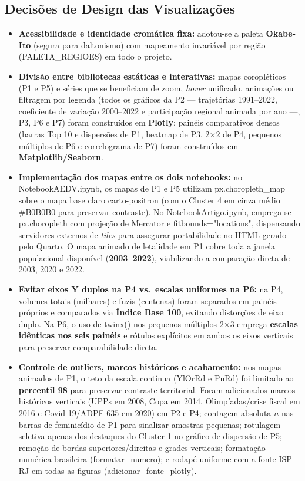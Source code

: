 \documentclass[11pt,a4paper]{article}
\newcommand{\code}[1]{{\ttfamily\footnotesize\allowbreak #1}}
\begin{document}
\subsection{Decisões de Design das Visualizações}
\begin{itemize}
  \setlength{\itemsep}{3pt}\setlength{\parskip}{0pt}
  \item \textbf{Acessibilidade e identidade cromática fixa:} adotou-se a paleta \textbf{Okabe-Ito} (segura para daltonismo) com mapeamento invariável por região (\code{PALETA\_REGIOES}) em todo o projeto.
  \item \textbf{Divisão entre bibliotecas estáticas e interativas:} mapas coropléticos (P1 e P5) e séries que se beneficiam de zoom, \textit{hover} unificado, animações ou filtragem por legenda (todos os gráficos da P2 --- trajetórias 1991--2022, coeficiente de variação 2000--2022 e participação regional animada por ano ---, P3, P6 e P7) foram construídos em \textbf{Plotly}; painéis comparativos densos (barras Top 10 e dispersões de P1, heatmap de P3, 2$\times$2 de P4, pequenos múltiplos de P6 e correlograma de P7) foram construídos em \textbf{Matplotlib/Seaborn}.
  \item \textbf{Implementação dos mapas entre os dois notebooks:} no \code{NotebookAEDV.ipynb}, os mapas de P1 e P5 utilizam \code{px.choropleth\_map} sobre o mapa base claro \code{carto-positron} (com o Cluster 4 em cinza médio \code{\#B0B0B0} para preservar contraste). No \code{NotebookArtigo.ipynb}, emprega-se \code{px.choropleth} com projeção de Mercator e \code{fitbounds="locations"}, dispensando servidores externos de \textit{tiles} para assegurar portabilidade no HTML gerado pelo Quarto. O mapa animado de letalidade em P1 cobre toda a janela populacional disponível (\textbf{2003--2022}), viabilizando a comparação direta de 2003, 2020 e 2022.
  \item \textbf{Evitar eixos Y duplos na P4 vs.\ escalas uniformes na P6:} na P4, volumes totais (milhares) e fuzis (centenas) foram separados em painéis próprios e comparados via \textbf{Índice Base 100}, evitando distorções de eixo duplo. Na P6, o uso de \code{twinx()} nos pequenos múltiplos 2$\times$3 emprega \textbf{escalas idênticas nos seis painéis} e rótulos explícitos em ambos os eixos verticais para preservar comparabilidade direta.
  \item \textbf{Controle de outliers, marcos históricos e acabamento:} nos mapas animados de P1, o teto da escala contínua (\code{YlOrRd} e \code{PuRd}) foi limitado ao \textbf{percentil 98} para preservar contraste territorial. Foram adicionados marcos históricos verticais (UPPs em 2008, Copa em 2014, Olimpíadas/crise fiscal em 2016 e Covid-19/ADPF 635 em 2020) em P2 e P4; contagem absoluta $n$ nas barras de feminicídio de P1 para sinalizar amostras pequenas; rotulagem seletiva apenas dos destaques do Cluster 1 no gráfico de dispersão de P5; remoção de bordas superiores/direitas e grades verticais; formatação numérica brasileira (\code{formatar\_numero}); e rodapé uniforme com a fonte ISP-RJ em todas as figuras (\code{adicionar\_fonte\_plotly}).
\end{itemize}
\end{document}
